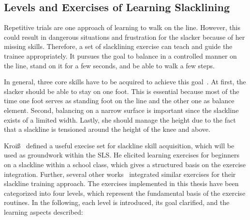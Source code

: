 \subsection{Levels and Exercises of Learning Slacklining}\label{3_3_2_StagesExercises}
Repetitive trials are one approach of learning to walk on the line. However, this could result in dangerous situations and frustration for the slacker because of her missing skills. Therefore, a set of slacklining exercise can teach and guide the trainee appropriately. It pursues the goal to balance in a controlled manner on the line, stand on it for a few seconds, and be able to walk a few steps. 

In general, three core skills have to be acquired to achieve this goal~\cite{Kroiss2007-ab}. At first, the slacker should be able to stay on one foot. This is essential because most of the time one foot serves as standing foot on the line and the other one as balance element. Second, balancing on a narrow surface is important since the slackline exists of a limited width. Lastly, she should manage the height due to the fact that a slackline is tensioned around the height of the knee and above.

Kroiß~\cite{Kroiss2007-ab} defined a useful execise set for slackline skill acquisition, which will be used as groundwork within the SLS. He elicited learning exercises for beginners on a slackline within a school class, which gives a structured basis on the exercise integration. Further, several other works~\cite{Balcom2005-wl, Donath2013-kk, Donath2016-gm, Granacher2010-ow, Keller2012-xh, Kleindl2011-bl, Pfusterschmied2013-yy, Thomann2013-aa} integrated similar exercises for their slackline training approach. The exercises implemented in this thesis have been categorized into four levels, which represent the fundamental basis of the exercise routines. In the following, each level is introduced, its goal clarified, and the learning aspects described:

